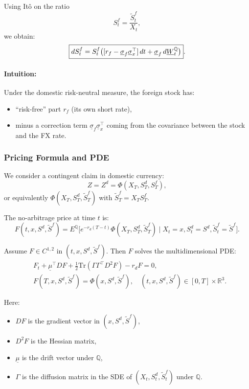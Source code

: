 \documentclass[12pt,a4paper]{article}
\theoremstyle{definition}
\begin{document}
Using Itô on the ratio
\[
S_t^f = \frac{\widetilde{S}_t^f}{X_t},
\]
we obtain:
\[
\fbox{$dS_t^f = S_t^f\big([r_f - \underline{\sigma}_f \underline{\sigma}_x^\top]\, dt + \underline{\sigma}_f\, d\underline{W}_t^\mathbb{Q}\big)$}.
\]

\paragraph{Intuition:}

Under the domestic risk-neutral measure, the foreign stock has:
\begin{itemize}
\item ``risk-free'' part $r_f$ (its own short rate),
\item minus a correction term $\underline{\sigma}_f \underline{\sigma}_x^\top$ coming from the covariance between the stock and the FX rate.
\end{itemize}

\subsubsection{Pricing Formula and PDE}

We consider a contingent claim in domestic currency:
\[
Z = Z^d = \Phi(X_T, S_T^d, S_T^f),
\]
or equivalently $\Phi(X_T, S_T^d, \widetilde{S}_T^f)$ with $\widetilde{S}_T^f = X_T S_T^f$.

The no-arbitrage price at time $t$ is:
\[
F(t, x, S^d, \widetilde{S}^f) = E^\mathbb{Q}\!\big[e^{-r_d(T-t)}\Phi(X_T, S_T^d, \widetilde{S}_T^f) \mid X_t = x, S_t^d = S^d, \widetilde{S}_t^f = \widetilde{S}^f\big].
\]

Assume $F \in C^{1,2}$ in $(t, x, S^d, \widetilde{S}^f)$. Then $F$ solves the multidimensional PDE:
\[
\begin{aligned}
&F_t + \underline{\mu}^\top DF + \tfrac{1}{2}\text{Tr}(\Gamma \Gamma^\top D^2 F) - r_d F = 0, \\
&F(T, x, S^d, \widetilde{S}^f) = \Phi(x, S^d, \widetilde{S}^f), \quad (t, x, S^d, \widetilde{S}^f) \in [0, T] \times \mathbb{R}^3.
\end{aligned}
\]

Here:
\begin{itemize}
\item $DF$ is the gradient vector in $(x, S^d, \widetilde{S}^f)$,
\item $D^2 F$ is the Hessian matrix,
\item $\underline{\mu}$ is the drift vector under $\mathbb{Q}$,
\item $\Gamma$ is the diffusion matrix in the SDE of $(X_t, S_t^d, \widetilde{S}_t^f)$ under $\mathbb{Q}$.
\end{itemize}
\end{document}
